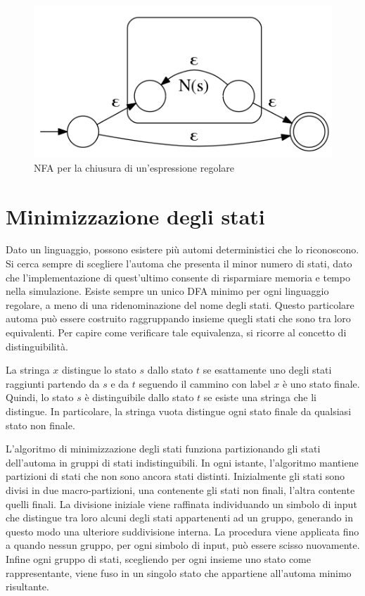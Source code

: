 \begin{figure}[htbp]
\centering
\includegraphics[scale=0.4]{./Img/automi/re_closure.png}
\caption{NFA per la chiusura di un'espressione regolare}
\label{fig:re_closure}
\end{figure}


\newpage
\section{Minimizzazione degli stati}
Dato un linguaggio, possono esistere più automi deterministici che lo riconoscono. Si cerca sempre di scegliere l'automa che presenta il minor numero di stati, dato che l'implementazione di quest'ultimo consente di risparmiare memoria e tempo nella simulazione. 
Esiste sempre un unico DFA minimo per ogni linguaggio regolare, a meno di una ridenominazione del nome degli stati. Questo particolare automa può essere costruito raggruppando insieme quegli stati che sono tra loro equivalenti. Per capire come verificare tale equivalenza, si ricorre al concetto di distinguibilità.
\begin{defn}
La stringa $x$ distingue lo stato $s$ dallo stato $t$ se esattamente uno degli stati raggiunti partendo da $s$ e da $t$ seguendo il cammino con label $x$ è uno stato finale. Quindi, lo stato $s$ è distinguibile dallo stato $t$ se esiste una stringa che li distingue.
In particolare, la stringa vuota distingue ogni stato finale da qualsiasi stato non finale.
\end{defn}

L'algoritmo di minimizzazione degli stati funziona partizionando gli stati dell'automa in gruppi di stati indistinguibili. 
In ogni istante, l'algoritmo mantiene partizioni di stati che non sono ancora stati distinti.
Inizialmente gli stati sono divisi in due macro-partizioni, una contenente gli stati non finali, l'altra contente quelli finali. La divisione iniziale viene raffinata individuando un simbolo di input che distingue tra loro alcuni degli stati appartenenti ad un gruppo, generando in questo modo una ulteriore suddivisione interna. La procedura viene applicata fino a quando nessun gruppo, per ogni simbolo di input, può essere scisso nuovamente.
Infine ogni gruppo di stati, scegliendo per ogni insieme uno stato come rappresentante, viene fuso in un singolo stato che appartiene all'automa minimo risultante. 